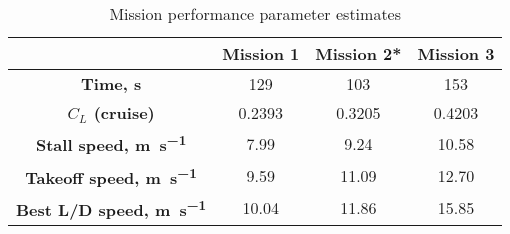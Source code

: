 \begin{table}[H]
\centering
    \begin{tabular}{@{}cccc@{}}
    \toprule
                                             & \textbf{Mission 1} & \textbf{Mission 2*} & \textbf{Mission 3} \\ \midrule
   \textbf{ Time, \si{\second} }                    & 129           & 103          & 153           \\
   \textbf{ $C_L$ (cruise)}                           & 0.2393             & 0.3205              & 0.4203             \\
   \textbf{ Stall speed, \si{\meter\per\second}}    & 7.99             & 9.24              & 10.58            \\
    \textbf{Takeoff speed, \si{\meter\per\second}}  & 9.59             & 11.09             & 12.70            \\
    \textbf{Best L/D speed, \si{\meter\per\second}} & 10.04            & 11.86             & 15.85            \\ \bottomrule
    \end{tabular}
\caption{Mission performance parameter estimates}
\label{tab: performance}
\end{table}